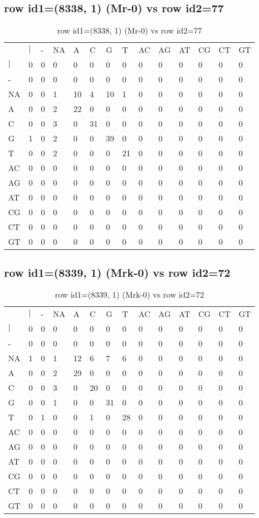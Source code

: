 \subsection{row id1=(8338, 1) (Mr-0) vs row id2=77}
\begin{center}
\begin{longtable}{|l|l|l|l|l|l|l|l|l|l|l|l|l|l|}
\caption{row id1=(8338, 1) (Mr-0) vs row id2=77} \label{table_dm348}\\
\hline
\\
\hline
&$|$&-&NA&A&C&G&T&AC&AG&AT&CG&CT&GT\\
$|$&0&0&0&0&0&0&0&0&0&0&0&0&0\\
-&0&0&0&0&0&0&0&0&0&0&0&0&0\\
NA&0&0&1&10&4&10&1&0&0&0&0&0&0\\
A&0&0&2&22&0&0&0&0&0&0&0&0&0\\
C&0&0&3&0&31&0&0&0&0&0&0&0&0\\
G&1&0&2&0&0&39&0&0&0&0&0&0&0\\
T&0&0&2&0&0&0&21&0&0&0&0&0&0\\
AC&0&0&0&0&0&0&0&0&0&0&0&0&0\\
AG&0&0&0&0&0&0&0&0&0&0&0&0&0\\
AT&0&0&0&0&0&0&0&0&0&0&0&0&0\\
CG&0&0&0&0&0&0&0&0&0&0&0&0&0\\
CT&0&0&0&0&0&0&0&0&0&0&0&0&0\\
GT&0&0&0&0&0&0&0&0&0&0&0&0&0\\
\hline
\end{longtable}
\end{center}

\subsection{row id1=(8339, 1) (Mrk-0) vs row id2=72}
\begin{center}
\begin{longtable}{|l|l|l|l|l|l|l|l|l|l|l|l|l|l|}
\caption{row id1=(8339, 1) (Mrk-0) vs row id2=72} \label{table_dm350}\\
\hline
\\
\hline
&$|$&-&NA&A&C&G&T&AC&AG&AT&CG&CT&GT\\
$|$&0&0&0&0&0&0&0&0&0&0&0&0&0\\
-&0&0&0&0&0&0&0&0&0&0&0&0&0\\
NA&1&0&1&12&6&7&6&0&0&0&0&0&0\\
A&0&0&2&29&0&0&0&0&0&0&0&0&0\\
C&0&0&3&0&20&0&0&0&0&0&0&0&0\\
G&0&0&1&0&0&31&0&0&0&0&0&0&0\\
T&0&1&0&0&1&0&28&0&0&0&0&0&0\\
AC&0&0&0&0&0&0&0&0&0&0&0&0&0\\
AG&0&0&0&0&0&0&0&0&0&0&0&0&0\\
AT&0&0&0&0&0&0&0&0&0&0&0&0&0\\
CG&0&0&0&0&0&0&0&0&0&0&0&0&0\\
CT&0&0&0&0&0&0&0&0&0&0&0&0&0\\
GT&0&0&0&0&0&0&0&0&0&0&0&0&0\\
\hline
\end{longtable}
\end{center}

